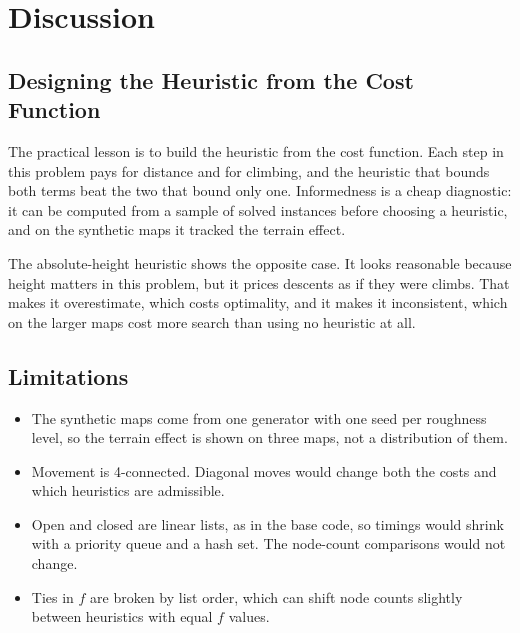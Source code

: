 \chapter{Discussion}
\label{ch:discussion}

\section{Designing the Heuristic from the Cost Function}

The practical lesson is to build the heuristic from the cost function. Each step in this problem pays for distance and for climbing, and the heuristic that bounds both terms beat the two that bound only one. Informedness is a cheap diagnostic: it can be computed from a sample of solved instances before choosing a heuristic, and on the synthetic maps it tracked the terrain effect.

The absolute-height heuristic shows the opposite case. It looks reasonable because height matters in this problem, but it prices descents as if they were climbs. That makes it overestimate, which costs optimality, and it makes it inconsistent, which on the larger maps cost more search than using no heuristic at all.


\section{Limitations}

\begin{itemize}
  \item The synthetic maps come from one generator with one seed per roughness level, so the terrain effect is shown on three maps, not a distribution of them.
  \item Movement is 4-connected. Diagonal moves would change both the costs and which heuristics are admissible.
  \item Open and closed are linear lists, as in the base code, so timings would shrink with a priority queue and a hash set. The node-count comparisons would not change.
  \item Ties in $f$ are broken by list order, which can shift node counts slightly between heuristics with equal $f$ values.
\end{itemize}

